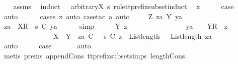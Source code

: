 %
\isadelimproof
\ \ %
\endisadelimproof
%
\isatagproof
{}\isamarkupfalse%
\ assms\ \isamarkupfalse%
\ {\isacharparenleft}induct\ {\isasymrho}\ {\isasymsigma}\ arbitrary{\isacharcolon}X\ s\ rule{\isacharcolon}tt{\isacharunderscore}prefix{\isacharunderscore}subset{\isachardot}induct{\isacharparenright}\isanewline
{}\isamarkupfalse%
\ {\isacharparenleft}{}\ x{\isacharparenright}\isanewline
\ \ \isamarkupfalse%
\ \isamarkupfalse%
\ {\isacharquery}case\ \isanewline
\ \ \ \ \isamarkupfalse%
\ auto\isanewline
\ \ \ \ \isamarkupfalse%
\ {\isacharparenleft}cases\ x{\isacharcomma}\ auto{\isacharcomma}\ case{\isacharunderscore}tac\ a{\isacharcomma}\ auto{\isacharparenright}\isanewline
{}\isamarkupfalse%
\isanewline
\ \ \isamarkupfalse%
\ {\isacharparenleft}{}\ Z\ za\ Y\ ya{\isacharparenright}\isanewline
\ \ \isamarkupfalse%
\ \isamarkupfalse%
\ {\isachardoublequoteopen}za\ {\isacharat}\ {\isacharbrackleft}{\isacharbrackleft}X{\isacharbrackright}\isactrlsub R{\isacharbrackright}\ {\isacharat}\ s\ {\isasymlesssim}\isactrlsub C\ ya{\isachardoublequoteclose}\isanewline
\ \ \ \ \isamarkupfalse%
\ simp\isanewline
\ \ \isamarkupfalse%
\ \isamarkupfalse%
\ {\isachardoublequoteopen}{\isasymexists}Y\ z\ {\isasymrho}\isanewline
\ \ \ \ \ \ \ \ \ \ \ \ \ \ \ ya\ {\isacharequal}\ {\isasymrho}\ {\isacharat}\ {\isacharbrackleft}Y{\isacharbrackright}\isactrlsub R\ {\isacharhash}\ z\ {\isasymand}\isanewline
\ \ \ \ \ \ \ \ \ \ \ \ \ \ \ X\ {\isasymsubseteq}\ Y\ {\isasymand}\ za\ {\isasymlesssim}\isactrlsub C\ {\isasymrho}\ {\isasymand}\ s\ {\isasymlesssim}\isactrlsub C\ z\ {\isasymand}\ List{\isachardot}length\ {\isasymrho}\ {\isacharequal}\ List{\isachardot}length\ za{\isachardoublequoteclose}\isanewline
\ \ \ \ \isamarkupfalse%
\ {}\ \isamarkupfalse%
\ auto\isanewline
\ \ \isamarkupfalse%
\ \isamarkupfalse%
\ {\isacharquery}case\ \isanewline
\ \ \ \ \isamarkupfalse%
\ auto\isanewline
\ \ \ \ \isamarkupfalse%
\ {\isacharparenleft}metis\ {\isachardoublequoteopen}{}{\isachardot}prems{\isachardoublequoteclose}\ append{\isacharunderscore}Cons\ tt{\isacharunderscore}prefix{\isacharunderscore}subset{\isachardot}simps{\isacharparenleft}{}{\isacharparenright}\ length{\isacharunderscore}Cons{\isacharparenright}\isanewline
